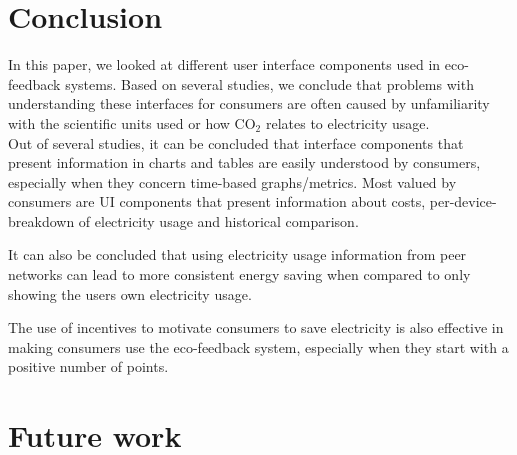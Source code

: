 \documentclass[journal]{vgtc}                %
\begin{document}

\section{Conclusion}
In this paper, we looked at different user interface components used in eco-feedback systems. Based on several studies, we conclude that problems with understanding these interfaces for consumers are often caused by unfamiliarity with the scientific units used or how CO$_2$ relates to electricity usage. \\

Out of several studies, it can be concluded that interface components that present information in charts and tables are easily understood by consumers, especially when they concern time-based graphs/metrics. 
Most valued by consumers are UI components that present information about costs, per-device-breakdown of electricity usage and historical comparison.

It can also be concluded that using electricity usage information from peer networks can lead to more consistent energy saving when compared to only showing the users own electricity usage.

The use of incentives to motivate consumers to save electricity is also effective in making consumers use the eco-feedback system, especially when they start with a positive number of points.


\section{Future work}





\end{document}
